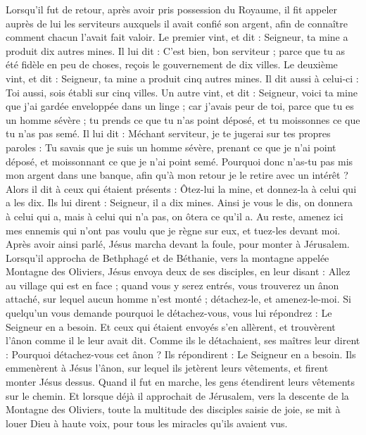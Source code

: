 \begin{multicols}{2}
Lorsqu’il fut de retour, après avoir pris possession du Royaume, il fit appeler auprès de lui les serviteurs auxquels il avait confié son argent, afin de connaître comment chacun l’avait fait valoir.
Le premier vint, et dit : Seigneur, ta mine a produit dix autres mines.
Il lui dit : C’est bien, bon serviteur ; parce que tu as été fidèle en peu de choses, reçois le gouvernement de dix villes.
Le deuxième vint, et dit : Seigneur, ta mine a produit cinq autres mines.
Il dit aussi à celui-ci : Toi aussi, sois établi sur cinq villes.
Un autre vint, et dit : Seigneur, voici ta mine que j'ai gardée enveloppée dans un linge ;
car j’avais peur de toi, parce que tu es un homme sévère ; tu prends ce que tu n'as point déposé, et tu moissonnes ce que tu n'as pas semé.
Il lui dit : Méchant serviteur, je te jugerai sur tes propres paroles : Tu savais que je suis un homme sévère, prenant ce que je n'ai point déposé, et moissonnant ce que je n'ai point semé.
Pourquoi donc n'as-tu pas mis mon argent dans une banque, afin qu’à mon retour je le retire avec un intérêt ?
Alors il dit à ceux qui étaient présents : Ôtez-lui la mine, et donnez-la à celui qui a les dix.
Ils lui dirent : Seigneur, il a dix mines.
Ainsi je vous le dis, on donnera à celui qui a, mais à celui qui n’a pas, on ôtera ce qu’il a.
Au reste, amenez ici mes ennemis qui n'ont pas voulu que je règne sur eux, et tuez-les devant moi.
Après avoir ainsi parlé, Jésus marcha devant la foule, pour monter à Jérusalem.
Lorsqu’il approcha de Bethphagé et de Béthanie, vers la montagne appelée Montagne des Oliviers, Jésus envoya deux de ses disciples,
en leur disant : Allez au village qui est en face ; quand vous y serez entrés, vous trouverez un ânon attaché, sur lequel aucun homme n'est monté ; détachez-le, et amenez-le-moi.
Si quelqu'un vous demande pourquoi le détachez-vous, vous lui répondrez : Le Seigneur en a besoin.
Et ceux qui étaient envoyés s'en allèrent, et trouvèrent l'ânon comme il le leur avait dit.
Comme ils le détachaient, ses maîtres leur dirent : Pourquoi détachez-vous cet ânon ?
Ils répondirent : Le Seigneur en a besoin.
Ils emmenèrent à Jésus l'ânon, sur lequel ils jetèrent leurs vêtements, et firent monter Jésus dessus.
Quand il fut en marche, les gens étendirent leurs vêtements sur le chemin.
Et lorsque déjà il approchait de Jérusalem, vers la descente de la Montagne des Oliviers, toute la multitude des disciples saisie de joie, se mit à louer Dieu à haute voix, pour tous les miracles qu'ils avaient vus.

\end{multicols}
